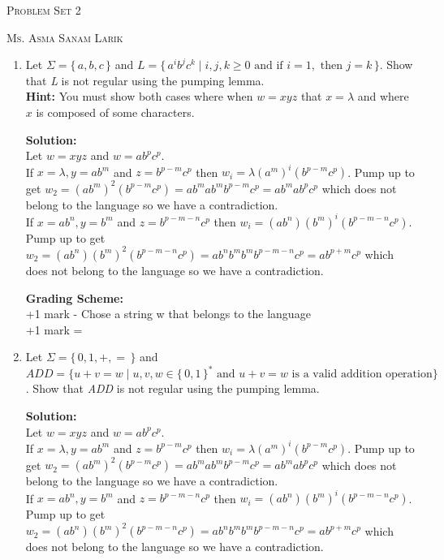 \documentclass[11pt, article, oneside]{memoir}
\newcommand{\set}[1]{\{\, #1\, \}}
\begin{document}
\begin{center}
\LARGE{\textsc{Problem Set 2}}
 
\large{\textsc{Ms. Asma Sanam Larik}}
\end{center}

\begin{enumerate}
    \item
        Let \(\Sigma = \set{a, b, c}\) and \(L = \set{ {a^i}{b^j}{c^k} \mid i, j, k \ge 0 \text{ and if } i = 1,  \text{ then } j = k}\). Show that \textit{L} is not regular using the pumping lemma.
        \\\textbf{Hint:} You must show both cases where when \(w = xyz\) that \(x = \lambda\) and where \(x\) is composed of some characters.

        \textbf{Solution:}
        \\Let \(w = xyz\) and \(w = ab^pc^p\).
        \\If \(x = \lambda, y = ab^m\) and \(z = b^{p - m}c^p\) then \(w_i = \lambda(a^m)^i(b^{p - m}c^p)\). Pump up to get \(w_2 = (ab^m)^2(b^{p - m}c^p) = ab^mab^mb^{p - m}c^p = ab^mab^pc^p\) which does not belong to the language so we have a contradiction.
        \\If \(x = ab^n, y = b^m\) and \(z = b^{p - m - n}c^p\) then \(w_i = (ab^n)(b^m)^i(b^{p - m - n}c^p)\). Pump up to get \(w_2 = (ab^n)(b^m)^2(b^{p - m - n}c^p) = ab^nb^mb^mb^{p - m - n}c^p = ab^{p + m}c^p\) which does not belong to the language so we have a contradiction.

        \textbf{Grading Scheme:}
        \\+1 mark - Chose a string w that belongs to the language
        \\+1 mark = 
        
    \item 
        Let \(\Sigma = \set{0, 1, +, =}\) and \(ADD = \{ u+v=w \mid u, v, w \in \set{0, 1}^* \text{ and } u+v=w \text{ is a valid addition operation}\}\). Show that \textit{ADD} is not regular using the pumping lemma.
        
        \textbf{Solution:}
        \\Let \(w = xyz\) and \(w = ab^pc^p\).
        \\If \(x = \lambda, y = ab^m\) and \(z = b^{p - m}c^p\) then \(w_i = \lambda(a^m)^i(b^{p - m}c^p)\). Pump up to get \(w_2 = (ab^m)^2(b^{p - m}c^p) = ab^mab^mb^{p - m}c^p = ab^mab^pc^p\) which does not belong to the language so we have a contradiction.
        \\If \(x = ab^n, y = b^m\) and \(z = b^{p - m - n}c^p\) then \(w_i = (ab^n)(b^m)^i(b^{p - m - n}c^p)\). Pump up to get \(w_2 = (ab^n)(b^m)^2(b^{p - m - n}c^p) = ab^nb^mb^mb^{p - m - n}c^p = ab^{p + m}c^p\) which does not belong to the language so we have a contradiction.


\end{enumerate}
\end{document}

